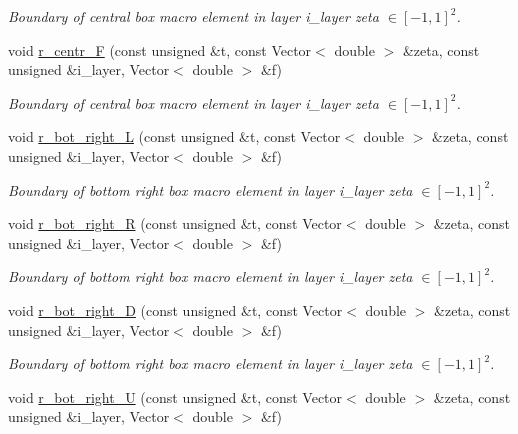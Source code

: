\begin{DoxyCompactItemize}
\begin{DoxyCompactList}\small\item\em Boundary of central box macro element in layer i\+\_\+layer zeta $ \in [-1,1]^2 $. \end{DoxyCompactList}\item 
void \hyperlink{classoomph_1_1QuarterTubeDomain_ace2c74d570fcb6a1ddf7a045ab3975c6}{r\+\_\+centr\+\_\+F} (const unsigned \&t, const Vector$<$ double $>$ \&zeta, const unsigned \&i\+\_\+layer, Vector$<$ double $>$ \&f)
\begin{DoxyCompactList}\small\item\em Boundary of central box macro element in layer i\+\_\+layer zeta $ \in [-1,1]^2 $. \end{DoxyCompactList}\item 
void \hyperlink{classoomph_1_1QuarterTubeDomain_a1c28597fc3361c177620ed914d1731ac}{r\+\_\+bot\+\_\+right\+\_\+L} (const unsigned \&t, const Vector$<$ double $>$ \&zeta, const unsigned \&i\+\_\+layer, Vector$<$ double $>$ \&f)
\begin{DoxyCompactList}\small\item\em Boundary of bottom right box macro element in layer i\+\_\+layer zeta $ \in [-1,1]^2 $. \end{DoxyCompactList}\item 
void \hyperlink{classoomph_1_1QuarterTubeDomain_ac269033d05cfc31f78ef6c555723ba3e}{r\+\_\+bot\+\_\+right\+\_\+R} (const unsigned \&t, const Vector$<$ double $>$ \&zeta, const unsigned \&i\+\_\+layer, Vector$<$ double $>$ \&f)
\begin{DoxyCompactList}\small\item\em Boundary of bottom right box macro element in layer i\+\_\+layer zeta $ \in [-1,1]^2 $. \end{DoxyCompactList}\item 
void \hyperlink{classoomph_1_1QuarterTubeDomain_a8f4332d868af0473ec2591790e8498ae}{r\+\_\+bot\+\_\+right\+\_\+D} (const unsigned \&t, const Vector$<$ double $>$ \&zeta, const unsigned \&i\+\_\+layer, Vector$<$ double $>$ \&f)
\begin{DoxyCompactList}\small\item\em Boundary of bottom right box macro element in layer i\+\_\+layer zeta $ \in [-1,1]^2 $. \end{DoxyCompactList}\item 
void \hyperlink{classoomph_1_1QuarterTubeDomain_aa733400bf322afaa379bad3e21e6ade0}{r\+\_\+bot\+\_\+right\+\_\+U} (const unsigned \&t, const Vector$<$ double $>$ \&zeta, const unsigned \&i\+\_\+layer, Vector$<$ double $>$ \&f)

\end{DoxyCompactItemize}
